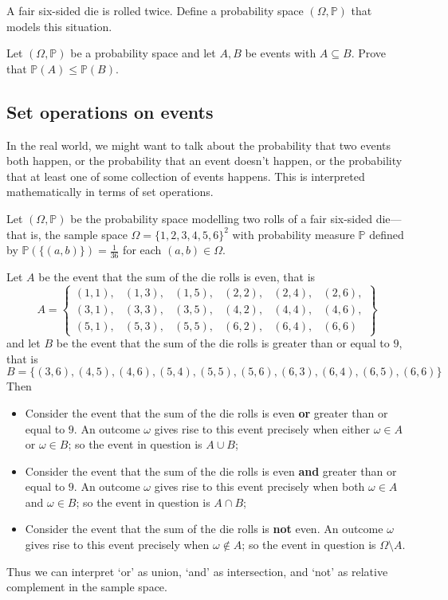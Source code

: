 \begin{exercise}
A fair six-sided die is rolled twice. Define a probability space $(\Omega, \mathbb{P})$ that models this situation.
\end{exercise}

\begin{exercise}
\label{exProbabilityOfSubset}
Let $(\Omega,\mathbb{P})$ be a probability space and let $A,B$ be events with $A \subseteq B$. Prove that $\mathbb{P}(A) \le \mathbb{P}(B)$.
\end{exercise}

\subsection*{Set operations on events}

In the real world, we might want to talk about the probability that two events both happen, or the probability that an event doesn't happen, or the probability that at least one of some collection of events happens. This is interpreted mathematically in terms of set operations.

\begin{example}
\label{exInformalOrAndNot}
Let $(\Omega,\mathbb{P})$ be the probability space modelling two rolls of a fair six-sided die---that is, the sample space $\Omega = \{ 1, 2, 3, 4, 5, 6 \}^2$ with probability measure $\mathbb{P}$ defined by $\mathbb{P}(\{(a,b)\}) = \frac{1}{36}$ for each $(a,b) \in \Omega$.

Let $A$ be the event that the sum of the die rolls is even, that is
\[ A = \begin{Bmatrix}(1,1), & (1,3), & (1,5), & (2,2), & (2,4), & (2,6),\\
(3,1), & (3,3), & (3,5), & (4,2), & (4,4), & (4,6),\\
(5,1), & (5,3), & (5,5), & (6,2), & (6,4), & (6,6)\phantom{,}
\end{Bmatrix} \]
and let $B$ be the event that the sum of the die rolls is greater than or equal to $9$, that is
\[ B = \{ (3,6), (4,5), (4,6), (5,4), (5,5), (5,6), (6,3), (6,4), (6,5), (6,6) \} \]
Then
\begin{itemize}
\item Consider the event that the sum of the die rolls is even \textbf{or} greater than or equal to $9$. An outcome $\omega$ gives rise to this event precisely when either $\omega \in A$ or $\omega \in B$; so the event in question is $A \cup B$;
\item Consider the event that the sum of the die rolls is even \textbf{and} greater than or equal to $9$. An outcome $\omega$ gives rise to this event precisely when both $\omega \in A$ and $\omega \in B$; so the event in question is $A \cap B$;
\item Consider the event that the sum of the die rolls is \textbf{not} even. An outcome $\omega$ gives rise to this event precisely when $\omega \not \in A$; so the event in question is $\Omega \setminus A$.
\end{itemize}
Thus we can interpret `or' as union, `and' as intersection, and `not' as relative complement in the sample space.
\end{example}

